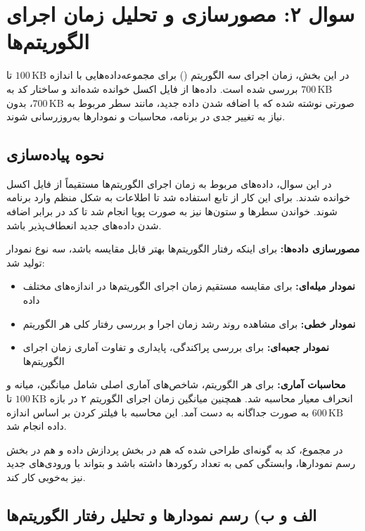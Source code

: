 \documentclass[12pt,a4paper]{article}
\begin{document}
	
	\newpage
	\section*{سوال ۲: مصورسازی و تحلیل زمان اجرای الگوریتم‌ها}
	
	در این بخش، زمان اجرای سه الگوریتم
	()
	برای مجموعه‌داده‌هایی با اندازه
	$100\,\text{KB}$
	تا
	$700\,\text{KB}$
	بررسی شده است. داده‌ها از فایل اکسل خوانده شده‌اند و ساختار کد به صورتی نوشته شده که با اضافه شدن داده جدید، مانند سطر مربوط به
	$700\,\text{KB}$،
	بدون نیاز به تغییر جدی در برنامه، محاسبات و نمودارها به‌روزرسانی شوند.
	
	\subsection*{نحوه پیاده‌سازی}
	
	در این سوال، داده‌های مربوط به زمان اجرای الگوریتم‌ها مستقیماً از فایل اکسل خوانده شدند. برای این کار از تابع
	استفاده شد تا اطلاعات به شکل منظم وارد برنامه شوند. خواندن سطرها و ستون‌ها نیز به صورت پویا انجام شد تا کد در برابر اضافه شدن داده‌های جدید انعطاف‌پذیر باشد.
	
	\textbf{مصورسازی داده‌ها:}
	برای اینکه رفتار الگوریتم‌ها بهتر قابل مقایسه باشد، سه نوع نمودار تولید شد:
	
	\begin{itemize}
		\item \textbf{نمودار میله‌ای:} برای مقایسه مستقیم زمان اجرای الگوریتم‌ها در اندازه‌های مختلف داده
		\item \textbf{نمودار خطی:} برای مشاهده روند رشد زمان اجرا و بررسی رفتار کلی هر الگوریتم
		\item \textbf{نمودار جعبه‌ای:} برای بررسی پراکندگی، پایداری و تفاوت آماری زمان اجرای الگوریتم‌ها
	\end{itemize}
	
	\textbf{محاسبات آماری:}
	برای هر الگوریتم، شاخص‌های آماری اصلی شامل میانگین، میانه و انحراف معیار محاسبه شد. همچنین میانگین زمان اجرای الگوریتم ۲ در بازه
	$100\,\text{KB}$
	تا
	$600\,\text{KB}$
	به صورت جداگانه به دست آمد. این محاسبه با فیلتر کردن
	بر اساس اندازه داده انجام شد.
	
	در مجموع، کد به گونه‌ای طراحی شده که هم در بخش پردازش داده و هم در بخش رسم نمودارها، وابستگی کمی به تعداد رکوردها داشته باشد و بتواند با ورودی‌های جدید نیز به‌خوبی کار کند.
	
	\subsection*{الف و ب) رسم نمودارها و تحلیل رفتار الگوریتم‌ها}
	
\end{document}

